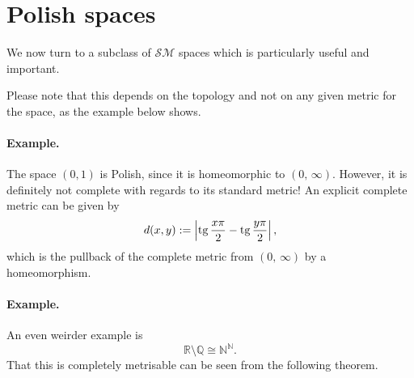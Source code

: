 
\section{Polish spaces}
We now turn to a subclass of \( \mathcal{SM} \) spaces which is particularly useful and important.



Please note that this depends on the topology and not on any given metric for the space, as the example below shows.

\paragraph{Example.} The space \( (0,1) \) is Polish, since it is homeomorphic to \( (0,\,\infty) \). However, it is definitely not complete with regards to its standard metric! An explicit complete metric can be given by 
\[ 
    d(x, y) := \left| \operatorname{tg} \frac{x\pi}{2} - \operatorname{tg} \frac{y\pi}{2} \right|,
\]
which is the pullback of the complete metric from \( (0,\,\infty) \) by a homeomorphism.

\paragraph{Example.} An even weirder example is
\[ 
    \mathbb{R} \setminus \mathbb{Q} \cong \mathbb{N}^{ \mathbb{N} }.
\]
That this is completely metrisable can be seen from the following theorem.



